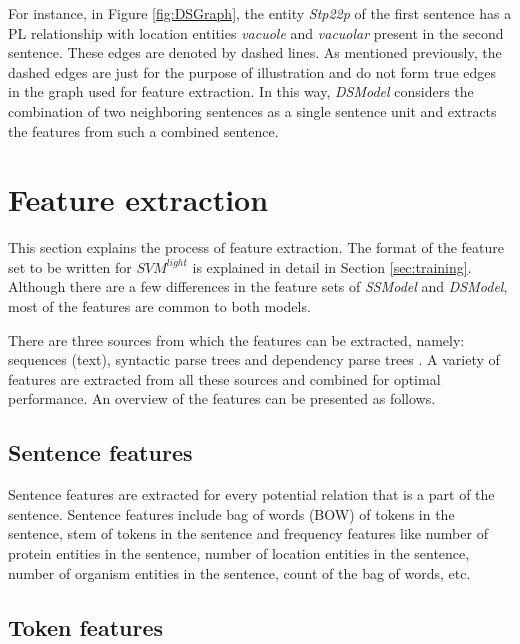 For instance, in Figure \ref{fig:DSGraph}, the entity \textit{Stp22p} of the first sentence has a PL relationship with location entities \textit{vacuole} and \textit{vacuolar} present in the second sentence. These edges are denoted by dashed lines. As mentioned previously, the dashed edges are just for the purpose of illustration and do not form true edges in the graph used for feature extraction. In this way, \textit{DSModel} considers the combination of two neighboring sentences as a single sentence unit and extracts the features from such a combined sentence.


\section{Feature extraction}\label{sec:featExp}

This section explains the process of feature extraction. The format of the feature set to be written for $SVM^{light}$ is explained in detail in Section \ref{sec:training}. Although there are a few differences in the feature sets of \textit{SSModel} and \textit{DSModel}, most of the features are common to both models.

There are three sources from which the features can be extracted, namely: sequences (text), syntactic parse trees and dependency parse trees \cite{jiang2007systematic}. A variety of features are extracted from all these sources and combined for optimal performance. An overview of the features can be presented as follows.

\subsection*{Sentence features}

Sentence features are extracted for every potential relation that is a part of the sentence. Sentence features include bag of words (BOW) of tokens in the sentence, stem of tokens in the sentence and frequency features like number of protein entities in the sentence, number of location entities in the sentence, number of organism entities in the sentence, count of the bag of words, etc.

\subsection*{Token features}

